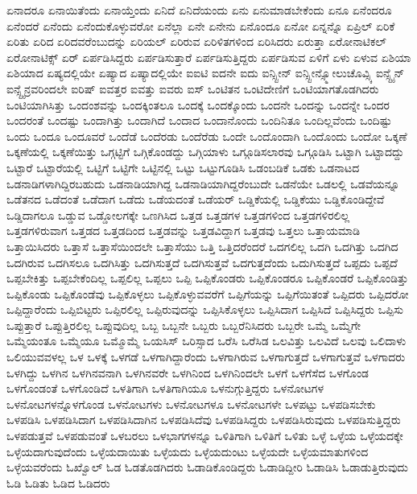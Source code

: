 {ಏನಾದರೂ
ಏನಾಯಿತೆಂದು
ಏನಾಯ್ತೆಂದು
ಏನಿದೆ
ಏನಿದೆಯಂದು
ಏನು
ಏನುಮಾಡಬೇಕೆಂದು
ಏನೂ
ಏನೆಂದರೂ
ಏನೆಂದರೆ
ಏನೆಂದು
ಏನೆಂದುಕೊಳ್ಳುವರೋ
ಏನೆಲ್ಲಾ
ಏನೇ
ಏನೇನು
ಏನೊಂದೂ
ಏನೋ
ಏನ್ನನ್ನೊ
ಏಪ್ರಿಲ್
ಏರಿಕೆ
ಏರಿತು
ಏರಿದ
ಏರಿದವರೆಂಬುದನ್ನು
ಏರಿಯಲ್
ಏರಿರುವ
ಏರಿಳಿತಗಳಿಂದ
ಏರಿಸಿದರು
ಏರುತ್ತಾ
ಏರೋನಾಟಿಕಲ್
ಏರೋನಾಟಿಕ್ಸ್
ಏರ್
ಏರ್ಪಡಿಸಿದ್ದರು
ಏರ್ಪಡಿಸುತ್ತಾರೆ
ಏರ್ಪಡಿಸುತ್ತಿದ್ದರು
ಏರ್ಪಡಿಸುವ
ಏಳಿಗೆ
ಏಳು
ಏಳುವ
ಏಶಿಯಾ
ಏಶಿಯಾದ
ಏಷ್ಯದಲ್ಲಿಯೇ
ಏಷ್ಯಾದ
ಏಷ್ಯಾದಲ್ಲಿಯೇ
ಐಐಟಿ
ಐದನೇ
ಐದು
ಐನ್ಸ್ಟೀನ್
ಐನ್ಸ್ಟೀನ್ಸ್ಮೋಲುಚೊವ್ಸ್ಕಿ
ಐನ್ಸ್ಟೈನ್
ಐನ್ಸ್ಟೈನ್ರವರಿಂದಲೇ
ಐರಿಷ್
ಐವತ್ತರ
ಐವತ್ತು
ಐವರು
ಐಸ್
ಒಂಟಿತನ
ಒಂಟಿದೇಣಿಗೆ
ಒಂಟಿಯಾಗತೊಡಗಿದರು
ಒಂಟಿಯಾಗಿಸಿತ್ತು
ಒಂದಂಶವನ್ನು
ಒಂದಕ್ಕಿಂತಲೂ
ಒಂದಕ್ಕೆ
ಒಂದಕ್ಕೊಂದು
ಒಂದನೇ
ಒಂದನ್ನು
ಒಂದನ್ನೇ
ಒಂದರ
ಒಂದರಂತೆ
ಒಂದಷ್ಟು
ಒಂದಾಗಿತ್ತು
ಒಂದಾಗಿದೆ
ಒಂದಾದ
ಒಂದಾನೊಂದು
ಒಂದಿನಿತೂ
ಒಂದಿಲ್ಲವೆಂದು
ಒಂದಿಷ್ಟು
ಒಂದು
ಒಂದೂ
ಒಂದೂವರೆ
ಒಂದೆಡೆ
ಒಂದೆರಡು
ಒಂದೆರೆಡು
ಒಂದೇ
ಒಂದೊಂದಾಗಿ
ಒಂದೊಂದು
ಒಂದೋ
ಒಕ್ಕಣೆ
ಒಕ್ಕಣೆಯಲ್ಲಿ
ಒಕ್ಕಣೆಯಿತ್ತು
ಒಗ್ಗಟ್ಟಿಗೆ
ಒಗ್ಗಿಕೊಂಡದ್ದು
ಒಗ್ಗಿಯಾಳು
ಒಗ್ಗೂಡಿಸಲಾರವು
ಒಗ್ಗೂಡಿಸಿ
ಒಟ್ಟಾಗಿ
ಒಟ್ಟಾದದ್ದು
ಒಟ್ಟಾರೆ
ಒಟ್ಟಾರೆಯಲ್ಲಿ
ಒಟ್ಟಿಗೆ
ಒಟ್ಟಿಗೇ
ಒಟ್ಟಿನಲ್ಲಿ
ಒಟ್ಟು
ಒಟ್ಟುಗೂಡಿಸಿ
ಒಡಂಬಡಿಕೆ
ಒಡಕು
ಒಡನಾಟದ
ಒಡನಾಡಿಗಳಾಗಿದ್ದಿರಬಹುದು
ಒಡನಾಡಿಯಾಗಿದ್ದ
ಒಡನಾಡಿಯಾಗಿದ್ದರೆಂಬುದೇ
ಒಡನೆಯೇ
ಒಡಲಲ್ಲಿ
ಒಡವೆಯನ್ನೂ
ಒಡೆತನದ
ಒಡೆದಂತೆ
ಒಡೆದಾಗ
ಒಡೆದು
ಒಡೆಯದಂತೆ
ಒಡೆಯರ್
ಒಡ್ಡಿಕೆಯಲ್ಲಿ
ಒಡ್ಡಿಕೆಯು
ಒಡ್ಡಿಕೊಂಡಿದ್ದೇವೆ
ಒಡ್ಡಿದಾಗಲೂ
ಒಡ್ಡುವ
ಒಡ್ಡೋಲಗಕ್ಕೇ
ಒಣಗಿಸಿದ
ಒತ್ತಡ
ಒತ್ತಡಗಳ
ಒತ್ತಡಗಳಿಂದ
ಒತ್ತಡಗಳಿರಲಿಲ್ಲ
ಒತ್ತಡಗಳಿರುವಾಗ
ಒತ್ತಡದ
ಒತ್ತಡದಿಂದ
ಒತ್ತಡವನ್ನು
ಒತ್ತಡವಿದ್ದಾಗ
ಒತ್ತಡವು
ಒತ್ತಲು
ಒತ್ತಾಯಮಾಡಿ
ಒತ್ತಾಯಿಸಿದರು
ಒತ್ತಾಸೆ
ಒತ್ತಾಸೆಯಿಂದಲೇ
ಒತ್ತಾಸೆಯು
ಒತ್ತಿ
ಒತ್ತಿದರೆಂದರೆ
ಒದಗಲಿಲ್ಲ
ಒದಗಿ
ಒದಗಿತ್ತು
ಒದಗಿದ
ಒದಗಿರುವ
ಒದಗಿಸಲೂ
ಒದಗಿಸಿತ್ತು
ಒದಗಿಸುತ್ತದೆ
ಒದಗಿಸುತ್ತವೆ
ಒದಗುತ್ತದೆಂದು
ಒದುಗಿಸುತ್ತದೆ
ಒಪ್ಪದು
ಒಪ್ಪದೆ
ಒಪ್ಪಬೇಕಿತ್ತು
ಒಪ್ಪಬೇಕೆಂದಿಲ್ಲ
ಒಪ್ಪಲಿಲ್ಲ
ಒಪ್ಪಲು
ಒಪ್ಪಿ
ಒಪ್ಪಿಕೊಂಡರು
ಒಪ್ಪಿಕೊಂಡರೂ
ಒಪ್ಪಿಕೊಂಡರೆ
ಒಪ್ಪಿಕೊಂಡಿತ್ತು
ಒಪ್ಪಿಕೊಂಡು
ಒಪ್ಪಿಕೊಂಡೆವು
ಒಪ್ಪಿಕೊಳ್ಳಲು
ಒಪ್ಪಿಕೊಳ್ಳುವವರೆಗೆ
ಒಪ್ಪಿಗೆಯನ್ನು
ಒಪ್ಪಿಗೆಯಿತಂತೆ
ಒಪ್ಪಿದರು
ಒಪ್ಪಿದರೋ
ಒಪ್ಪಿದ್ದಾರೆಂದು
ಒಪ್ಪಿಬಿಟ್ಟರು
ಒಪ್ಪಿರಲಿಲ್ಲ
ಒಪ್ಪಿರುವುದನ್ನು
ಒಪ್ಪಿಸಿಕೊಳ್ಳಲು
ಒಪ್ಪಿಸಿದಾಗ
ಒಪ್ಪಿಸಿದೆ
ಒಪ್ಪಿಸಿದ್ದರು
ಒಪ್ಪಿಸು
ಒಪ್ಪುತ್ತಾರೆ
ಒಪ್ಪುತ್ತಿರಲಿಲ್ಲ
ಒಪ್ಪುವುದಿಲ್ಲ
ಒಬ್ಬ
ಒಬ್ಬನೇ
ಒಬ್ಬರು
ಒಬ್ಬರೆನಿಸಿದರು
ಒಬ್ಬರೇ
ಒಮ್ಮೆ
ಒಮ್ಮೆಗೇ
ಒಮ್ಮೆಯಂತೂ
ಒಮ್ಮೆಯೂ
ಒಮ್ಮೊಮ್ಮೆ
ಒಯಸಿಸ್
ಒರಿಸ್ಸಾದ
ಒರೆಸಿ
ಒರೆಸಿಡ
ಒಲವಿತ್ತು
ಒಲವಿದೆ
ಒಲವು
ಒಲಿದಾಳು
ಒಲಿಯುವವಳಲ್ಲ
ಒಳ
ಒಳಕ್ಕೆ
ಒಳಗಡೆ
ಒಳಗಾಗಿದ್ದಾರೆಂದು
ಒಳಗಾಗಿರುವ
ಒಳಗಾಗುತ್ತದೆ
ಒಳಗಾಗುತ್ತವೆ
ಒಳಗಾದರು
ಒಳಗಿದ್ದು
ಒಳಗಿನ
ಒಳಗಿನವನಾಗಿ
ಒಳಗಿನವರೇ
ಒಳಗಿನಿಂದ
ಒಳಗಿನಿಂದಲೇ
ಒಳಗೆ
ಒಳಗೆಸೆದ
ಒಳಗೊಂಡ
ಒಳಗೊಂಡಂತೆ
ಒಳಗೊಂಡಿದೆ
ಒಳತಿಗಾಗಿ
ಒಳತಿಗಾಗಿಯೂ
ಒಳನುಗ್ಗುತ್ತಿದ್ದರು
ಒಳನೋಟಗಳ
ಒಳನೋಟಗಳನ್ನೊಳಗೊಂಡ
ಒಳನೋಟಗಳು
ಒಳನೋಟಗಳೂ
ಒಳನೋಟಗಳೇ
ಒಳಪಟ್ಟು
ಒಳಪಡಿಸಬೇಕು
ಒಳಪಡಿಸಿ
ಒಳಪಡಿಸಿದಾಗ
ಒಳಪಡಿಸಿದಾಗಿನ
ಒಳಪಡಿಸಿದೆವು
ಒಳಪಡಿಸಿದ್ದರು
ಒಳಪಡಿಸಿರುವುದು
ಒಳಪಡಿಸುತ್ತಿದ್ದರು
ಒಳಪಡುತ್ತವೆ
ಒಳಪಡುವಂತೆ
ಒಳಬರಲು
ಒಳಭಾಗಗಳನ್ನೂ
ಒಳಿತಿಗಾಗಿ
ಒಳಿತಿಗೆ
ಒಳಿತು
ಒಳ್ಳೆ
ಒಳ್ಳೆಯ
ಒಳ್ಳೆಯದಕ್ಕೇ
ಒಳ್ಳೆಯದಾಗುವುದೆಂದು
ಒಳ್ಳೆಯದಾಯಿತು
ಒಳ್ಳೆಯದು
ಒಳ್ಳೆಯದುಂಟು
ಒಳ್ಳೆಯದೇ
ಒಳ್ಳೆಯಮಾತುಗಳಿಂದ
ಒಳ್ಳೆಯವರೆಂದು
ಓಖ್ವೊಲ್
ಓಡ
ಓಡತೊಡಗಿದರು
ಓಡಾಡಿಕೊಂಡಿದ್ದರು
ಓಡಾಡಿದ್ದೀರಿ
ಓಡಾಡಿಸಿ
ಓಡಾಡುತ್ತಿರುವುದು
ಓಡಿ
ಓಡಿತು
ಓಡಿದ
ಓಡಿದರು
}
